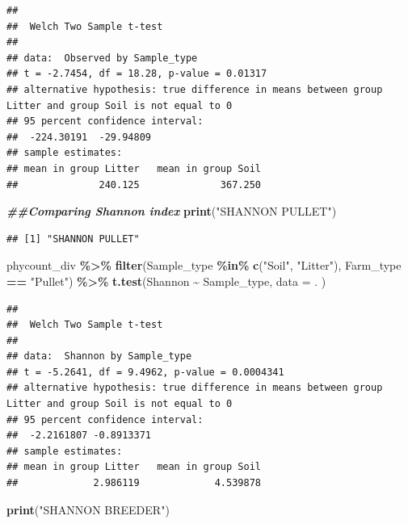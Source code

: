 \documentclass[
]{article}
\newenvironment{Shaded}{\begin{snugshade}}{\end{snugshade}}
\newcommand{\AttributeTok}[1]{\textcolor[rgb]{0.13,0.29,0.53}{#1}}
\newcommand{\DocumentationTok}[1]{\textcolor[rgb]{0.56,0.35,0.01}{\textbf{\textit{#1}}}}
\newcommand{\FunctionTok}[1]{\textcolor[rgb]{0.13,0.29,0.53}{\textbf{#1}}}
\newcommand{\NormalTok}[1]{#1}
\newcommand{\SpecialCharTok}[1]{\textcolor[rgb]{0.81,0.36,0.00}{\textbf{#1}}}
\newcommand{\StringTok}[1]{\textcolor[rgb]{0.31,0.60,0.02}{#1}}
\begin{document}
\begin{verbatim}
## 
##  Welch Two Sample t-test
## 
## data:  Observed by Sample_type
## t = -2.7454, df = 18.28, p-value = 0.01317
## alternative hypothesis: true difference in means between group Litter and group Soil is not equal to 0
## 95 percent confidence interval:
##  -224.30191  -29.94809
## sample estimates:
## mean in group Litter   mean in group Soil 
##              240.125              367.250
\end{verbatim}

\begin{Shaded}
\begin{Highlighting}[]
\DocumentationTok{\#\#Comparing Shannon index}
\FunctionTok{print}\NormalTok{(}\StringTok{"SHANNON PULLET"}\NormalTok{)}
\end{Highlighting}
\end{Shaded}

\begin{verbatim}
## [1] "SHANNON PULLET"
\end{verbatim}

\begin{Shaded}
\begin{Highlighting}[]
\NormalTok{phycount\_div }\SpecialCharTok{\%\textgreater{}\%}
  \FunctionTok{filter}\NormalTok{(Sample\_type }\SpecialCharTok{\%in\%} \FunctionTok{c}\NormalTok{(}\StringTok{"Soil"}\NormalTok{, }\StringTok{"Litter"}\NormalTok{),}
\NormalTok{         Farm\_type }\SpecialCharTok{==} \StringTok{"Pullet"}\NormalTok{) }\SpecialCharTok{\%\textgreater{}\%}
  \FunctionTok{t.test}\NormalTok{(Shannon }\SpecialCharTok{\textasciitilde{}}\NormalTok{ Sample\_type, }
       \AttributeTok{data =}\NormalTok{ .}
\NormalTok{       )}
\end{Highlighting}
\end{Shaded}

\begin{verbatim}
## 
##  Welch Two Sample t-test
## 
## data:  Shannon by Sample_type
## t = -5.2641, df = 9.4962, p-value = 0.0004341
## alternative hypothesis: true difference in means between group Litter and group Soil is not equal to 0
## 95 percent confidence interval:
##  -2.2161807 -0.8913371
## sample estimates:
## mean in group Litter   mean in group Soil 
##             2.986119             4.539878
\end{verbatim}

\begin{Shaded}
\begin{Highlighting}[]
\FunctionTok{print}\NormalTok{(}\StringTok{"SHANNON BREEDER"}\NormalTok{)}
\end{Highlighting}
\end{Shaded}
\end{document}
